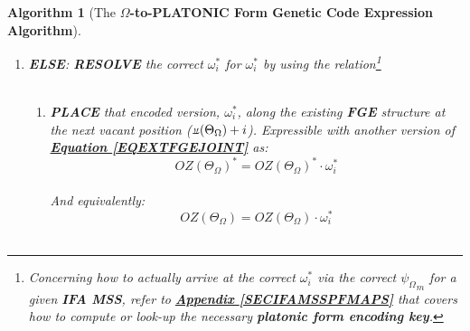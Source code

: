 \documentclass[a4paper, 18pt]{book} %
\newtheorem{alg}{Algorithm}
\newcommand{\invpi}{\rotatebox[origin=c]{180}{$\pi$}}
\begin{document}
\begin{alg}[The \textbf{$\Omega$-to-PLATONIC Form Genetic Code Expression Algorithm}]
\begin{enumerate}
{\begin{enumerate}
{\begin{enumerate}
{\begin{enumerate}
{		}
		\item \textbf{PROCEED} to the next symbol in \textbf{IFA MSS}, $\overset{>}{OZ(\Theta_\Omega)}$\\ (loop from \textbf{Step\#2(e))}.
		\end{enumerate}
	}
	\item { \textbf{ELSE}: \textbf{RESOLVE} the correct  $\boxed{\omega_i^*}$  for  $\omega_i^*$  by using the relation\footnote{Concerning how to actually arrive at the correct $\boxed{\omega_i^*}$ via the correct $\boxed{\psi_\Omega}_m$ for a given \textbf{IFA MSS}, refer to \textbf{\hyperref[SECIFAMSSPFMAPS]{Appendix \ref{SECIFAMSSPFMAPS}}} that covers how to compute or look-up the necessary \textbf{platonic form encoding key}.}\\


\\



	\begin{enumerate}
        \item{\textbf{PLACE} that encoded version, $\boxed{\omega_i^*}$, along the existing \textbf{FGE} structure at the next vacant position ($\invpi(\Theta_\Omega)+i$). Expressible with another version of \textbf{\hyperref[EQEXTFGEJOINT]{Equation \ref{EQEXTFGEJOINT}}} as:\\
	
	\begin{equation}
	\label{EQEXTFGEPF}
		\boxed{OZ(\Theta_\Omega)}^* = \boxed{OZ(\Theta_\Omega)}^* \cdot \boxed{\omega_i^*}
		\end{equation}\\
		
		And equivalently:\\
		
		\begin{equation}
		\label{EQEXTFGEPFSUF}
		\boxed{OZ(\Theta_\Omega)} = \boxed{OZ(\Theta_\Omega)} \cdot \boxed{\omega_i^*}
		\end{equation}\\
		
}
\end{enumerate}}
\end{enumerate}}
\end{enumerate}}
\end{enumerate}
\end{alg}
\end{document}
